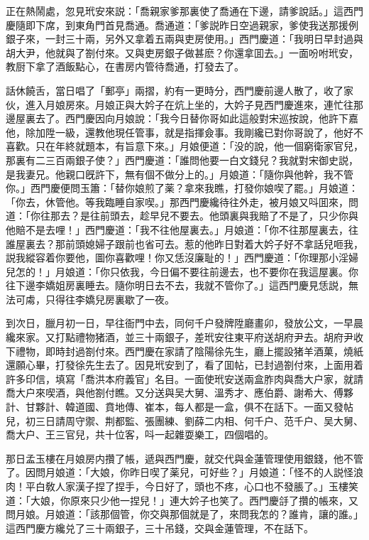 正在熱鬧處，忽見玳安來説：「喬親家爹那裏使了喬通在下邊，請爹說話。」這西門慶隨即下席，到東角門首見喬通。喬通道：「爹説昨日空過親家，爹使我送那援例銀子來，一封三十兩，另外又拿着五兩與吏房使用。」西門慶道：「我明日早封過與胡大尹，他就與了劄付來。又與吏房銀子做甚麽？你還拿囬去。」一面吩咐玳安，教厨下拿了酒飯點心，在書房内管待喬通，打發去了。

話休饒舌，當日唱了「郵亭」兩摺，約有一更時分，西門慶前邊人散了，收了家伙，進入月娘房來。月娘正與大妗子在炕上坐的，大妗子見西門慶進來，連忙往那邊屋裏去了。西門慶因向月娘說：「我今日替你哥如此這般對宋巡按說，他許下嘉他，除加陞一級，還教他現任管事，就是指揮僉事。我剛纔已對你哥說了，他好不喜歡。只在年終就題本，有旨意下來。」月娘便道：「没的說，他一個窮衛家官兒，那裏有二三百兩銀子使？」西門慶道：「誰問他要一白文錢兒？我就對宋御史説，是我妻兄。他親口旣許下，無有個不做分上的。」月娘道：「隨你與他幹，我不管你。」西門慶便問玉簫：「替你娘煎了薬？拿來我瞧，打發你娘喫了罷。」月娘道：「你去，休管他。等我臨睡自家喫。」那西門慶纔待往外走，被月娘又呌囬來，問道：「你往那去？是往前頭去，趁早兒不要去。他頭裏與我賠了不是了，只少你與他賠不是去哩！」西門慶道：「我不往他屋裏去。」月娘道：「你不往那屋裏去，往誰屋裏去？那前頭媳婦子跟前也省可去。惹的他昨日對着大妗子好不拿話兒咂我，説我縱容着你要他，圖你喜歡哩！你又恁沒廉耻的！」西門慶道：「你理那小淫婦兒怎的！」月娘道：「你只依我，今日偏不要往前邊去，也不要你在我這屋裏。你往下邊李嬌姐房裏睡去。隨你明日去不去，我就不管你了。」這西門慶見恁説，無法可䖏，只得往李嬌兒房裏歇了一夜。

到次日，臘月初一日，早往衙門中去，同何千户發牌陞廳畫卯，發放公文，一早晨纔來家。又打點禮物猪酒，並三十兩銀子，差玳安往東平府送胡府尹去。胡府尹收下禮物，即時封過劄付來。西門慶在家請了陰陽徐先生，廳上擺設猪羊酒菓，燒紙還願心畢，打發徐先生去了。因見玳安到了，看了囬帖，已封過劄付來，上面用着許多印信，填寫「喬洪本府義官」名目。一面使玳安送兩盒胙肉與喬大户家，就請喬大户來喫酒，與他劄付瞧。又分送與吴大舅、溫秀才、應伯爵、謝希大、傅夥計、甘夥計、韓道國、賁地傳、崔本，每人都是一盒，俱不在話下。一面又發帖兒，初三日請周守禦、荆都監、張團練、劉薛二内相、何千户、范千户、吴大舅、喬大户、王三官兒，共十位客，呌一起雜耍樂工，四個唱的。

那日孟玉樓在月娘房内攢了帳，遞與西門慶，就交代與金蓮管理使用銀錢，他不管了。因問月娘道：「大娘，你昨日喫了薬兒，可好些？」月娘道：「怪不的人説怪浪肉！平白敎人家漢子捏了捏手，今日好了，頭也不疼，心口也不發脹了。」玉樓笑道：「大娘，你原來只少他一捏兒！」連大妗子也笑了。西門慶㧱了攢的帳來，又問月娘。月娘道：「該那個管，你交與那個就是了，來問我怎的？誰肯，讓的誰。」這西門慶方纔兑了三十兩銀子，三十吊錢，交與金蓮管理，不在話下。

